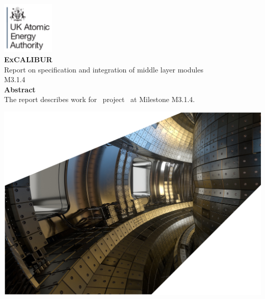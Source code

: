 \documentclass[11pt,twoside,a4paper]{article}
\newcommand{\culhamtitle}{\LARGE Report on specification and integration of middle layer modules  \\[1.0\baselineskip] M3.1.4 }%
\begin{document}
\begin{titlepage}
\includegraphics[width=2.5cm]{../corpics/cofaplus} \\[2.0\baselineskip]
{\LARGE {\textbf{\textsf{ExCALIBUR}}}}\\[2.0\baselineskip]
{\LARGE \culhamtitle } \\[2.0\baselineskip]
{\textbf{\textsf{Abstract}}}\\
The report describes work for \exc \ project \nep \
at Milestone M3.1.4.

\vfill
\hspace{-20mm}\includegraphics[width=22.0cm]{../corpics/tokintcrop}
\end{titlepage}

\clearpage
%
\end{document}
